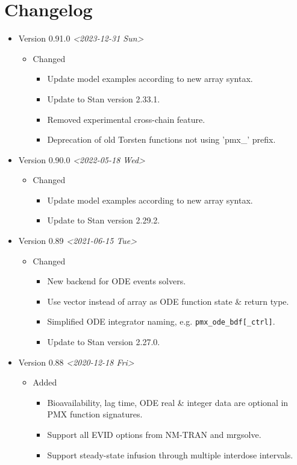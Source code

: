 \documentclass[12pt, reqno, oneside]{amsbook}
\numberwithin{equation}{chapter}
\numberwithin{figure}{chapter}
\numberwithin{table}{chapter}
\theoremstyle{remark}
\begin{document}
\chapter{Changelog}
\label{sec:org6ee814c}
\begin{itemize}
\item Version 0.91.0 \textit{<2023-12-31 Sun>}
\begin{itemize}
\item Changed
\begin{itemize}
\item Update model examples according to new array syntax.
\item Update to Stan version 2.33.1.
\item Removed experimental cross-chain feature.
\item Deprecation of old Torsten functions not using 'pmx\_' prefix.
\end{itemize}
\end{itemize}
\item Version 0.90.0 \textit{<2022-05-18 Wed>}
\begin{itemize}
\item Changed
\begin{itemize}
\item Update model examples according to new array syntax.
\item Update to Stan version 2.29.2.
\end{itemize}
\end{itemize}
\item Version 0.89 \textit{<2021-06-15 Tue>}
\begin{itemize}
\item Changed
\begin{itemize}
\item New backend for ODE events solvers.
\item Use vector instead of array as ODE function state \& return type.
\item Simplified ODE integrator naming, e.g. \texttt{pmx\_ode\_bdf[\_ctrl]}.
\item Update to Stan version 2.27.0.
\end{itemize}
\end{itemize}
\item Version 0.88 \textit{<2020-12-18 Fri>}
\begin{itemize}
\item Added
\begin{itemize}
\item Bioavailability, lag time, ODE real \& integer data are optional in PMX function signatures.
\item Support all EVID options from NM-TRAN and mrgsolve.
\item Support steady-state infusion through multiple interdose intervals.
\end{itemize}
\end{itemize}


\end{itemize}
\end{document}
